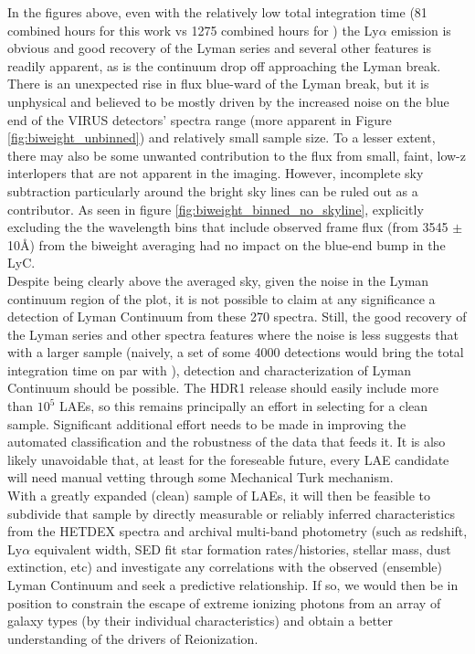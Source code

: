 \documentclass{aastex62}
\begin{document}
In the figures above, even with the relatively low total integration time (81 combined hours for this work vs 1275 combined hours for \cite{Steidel}) the Ly$\alpha$ emission is obvious and good recovery of the Lyman series and several other features is readily apparent, as is the continuum drop off approaching the Lyman break. There is an unexpected rise in flux blue-ward of the Lyman break, but it is unphysical and believed to be mostly driven by the increased noise on the blue end of the VIRUS detectors' spectra range (more apparent in Figure \ref{fig:biweight_unbinned}) and relatively small sample size. To a lesser extent, there may also be some unwanted contribution to the flux from small, faint, low-z interlopers that are not apparent in the imaging. However, incomplete sky subtraction particularly around the bright sky lines can be ruled out as a contributor. As seen in figure \ref{fig:biweight_binned_no_skyline}, explicitly excluding the the wavelength bins that include observed frame flux (from 3545 $\pm$ 10$\mbox{\AA}$) from the biweight averaging had no impact on the blue-end bump in the LyC.\\





Despite being clearly above the averaged sky, given the noise in the Lyman continuum region of the plot, it is not possible to claim at any significance a detection of Lyman Continuum from these 270 spectra. Still, the good recovery of the Lyman series and other spectra features where the noise is less suggests that with a larger sample (naively, a set of some 4000 detections would bring the total integration time on par with \cite{Steidel}), detection and characterization of Lyman Continuum should be possible. The HDR1 release should easily include more than $10^{5}$ LAEs, so this remains principally an effort in selecting for a clean sample. Significant additional effort needs to be made in improving the automated classification and the robustness of the data that feeds it. It is also likely unavoidable that, at least for the foreseable future, every LAE candidate will need manual vetting through some Mechanical Turk mechanism. \\


With a greatly expanded (clean) sample of LAEs, it will then be feasible to subdivide that sample by directly measurable or reliably inferred characteristics from the HETDEX spectra and archival multi-band photometry (such as redshift, Ly$\alpha$ equivalent width, SED fit star formation rates/histories, stellar mass, dust extinction, etc) and investigate any correlations with the observed (ensemble) Lyman Continuum and seek a predictive relationship. If so, we would then be in position to constrain the escape of extreme ionizing photons from an array of galaxy types (by their individual characteristics) and obtain a better understanding of the drivers of Reionization.\\
\end{document}
